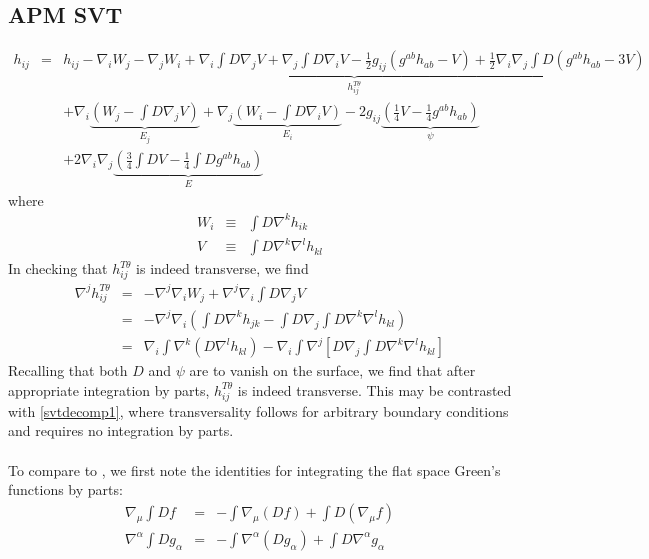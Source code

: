 \documentclass[10pt,letterpaper]{article}
\numberwithin{equation}{section}
\begin{document}
\begin{appendices}
\section{APM SVT}
%
%
\begin{eqnarray}
h_{ij} &=& \underbrace{ h_{ij} - \nabla_i W_j - \nabla_j W_i + \nabla_i \int D\nabla_j  V + \nabla_j\int D\nabla_i V-\tfrac12 g_{ij}(g^{ab}h_{ab}-V) + \tfrac12 \nabla_i\nabla_j \int D (g^{ab}h_{ab}-3V)}_{h_{ij}^{T\theta}}
\nonumber\\
&&+\nabla_i \underbrace{\left( W_j - \int D\nabla_j V\right)}_{E_j} + \nabla_j \underbrace{\left(W_i -\int D\nabla_i V\right)}_{E_i}-2g_{ij}\underbrace{ \left( \tfrac14 V-\tfrac14 g^{ab}h_{ab}\right)}_{\psi}
\nonumber\\
&&+2\nabla_i\nabla_j \underbrace{\left( \tfrac34 \int D V - \tfrac14 \int D g^{ab}h_{ab}\right)}_{E}
\label{APMdecomp}
\end{eqnarray}
where
\begin{eqnarray}
W_i &\equiv& \int D \nabla^k h_{ik}
\nonumber\\
V &\equiv& \int D \nabla^k \nabla^l h_{kl}
\end{eqnarray}
In checking that $h_{ij}^{T\theta}$ is indeed transverse, we find
\begin{eqnarray}
\nabla^j h_{ij}^{T\theta} &=& -\nabla^j\nabla_i W_j + \nabla^j\nabla_i\int D\nabla_j V
\nonumber\\
&=& -\nabla^j \nabla_i \left( \int D \nabla^k h_{jk} - \int D \nabla_j \int D \nabla^k\nabla^l h_{kl}\right)
\nonumber\\
&=& \nabla_i \int \nabla^k(D \nabla^l h_{kl}) - \nabla_i \int \nabla^j\left[D\nabla_j\int D\nabla^k \nabla^l h_{kl}\right]
\end{eqnarray}
Recalling that both $D$ and $\psi$ are to vanish on the surface, we find that after appropriate integration by parts, $h_{ij}^{T\theta}$ is indeed transverse. This may be contrasted with \eqref{svtdecomp1}, where transversality follows for arbitrary boundary conditions and requires no integration by parts. 
\\ \\
To compare to \cite{APM}, we first note the identities for integrating the flat space Green's functions by parts:
%
\begin{eqnarray}
\nabla_\mu \int D f &=& -\int \nabla_\mu(Df)+\int D(\nabla_\mu f)
\nonumber\\
\nabla^\alpha \int D g_\alpha &=&  -\int \nabla^\alpha(Dg_\alpha) + \int D\nabla^\alpha g_\alpha

\end{eqnarray}
\end{appendices}
\end{document}
